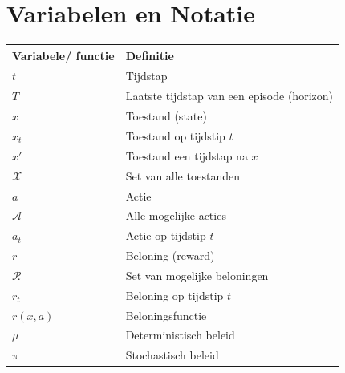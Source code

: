 \documentclass[a4paper,12pt]{article}
\begin{document}
\newpage
\section*{Variabelen en Notatie}


\begin{table}[h]
    \centering
    \begin{tabular}{>{\raggedright}p{3cm} >{\raggedright\arraybackslash}p{10cm}}
        \textbf{Variabele/ functie} & \textbf{Definitie}                                \\
        \hline
        $t$                         & Tijdstap                                          \\
        $T$                         & Laatste tijdstap van een episode (horizon)        \\
        $x$                         & Toestand (state)                                  \\
        $x_t$                       & Toestand op tijdstip $t$                          \\
        $x'$                        & Toestand een tijdstap na $x$                      \\
        $\mathcal{X}$               & Set van alle toestanden                           \\
        $a$                         & Actie                                             \\
        $\mathcal{A}$               & Alle mogelijke acties                             \\
        $a_t$                       & Actie op tijdstip $t$                             \\
        $r$                         & Beloning (reward)                                 \\
        $\mathcal{R}$               & Set van mogelijke beloningen                      \\
        $r_t$                       & Beloning op tijdstip $t$                          \\
        $r(x, a)$                   & Beloningsfunctie                                  \\
        $\mu$                       & Deterministisch beleid                            \\
        $\pi$                       & Stochastisch beleid                               \\

\end{tabular}
\end{table}
\end{document}
